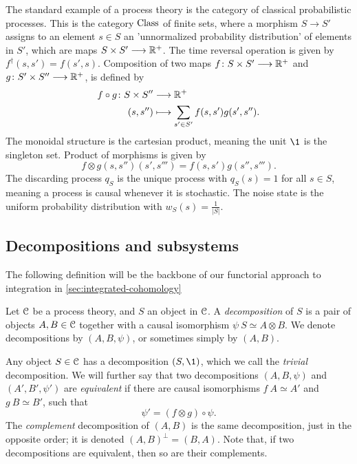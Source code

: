 \begin{example}
    The standard example of a process theory is the category of classical probabilistic processes. This is the category $\mathrm{Class}$ of finite sets, where a morphism $S\to S'$ assigns to an element $s\in S$ an 'unnormalized probability distribution' of elements in $S'$, which are maps $S\times S' \longrightarrow \mathbb{R}^+$. The time reversal operation is given by $f^\dagger(s,s') = f(s',s)$. Composition of two maps $f\colon S\times S'\longrightarrow \mathbb{R}^+$ and $g\colon S'\times S'' \longrightarrow \mathbb{R}^+$, is defined by
    \begin{align*}
        f\circ g \colon S\times S'' &\longrightarrow \mathbb{R}^+ \\
        (s,s'') &\longmapsto \sum_{s'\in S'}f(s,s')g(s',s'').
    \end{align*}
    The monoidal structure is the cartesian product, meaning the unit $\1$ is the singleton set. Product of morphisms is given by 
    $$f\otimes g (s,s'')(s',s''') = f(s,s')g(s'',s''').$$
    The discarding process $q_S$ is the unique process with $q_S(s) = 1$ for all $s\in S$, meaning a process is causal whenever it is stochastic. The noise state is the uniform probability distribution with $w_S(s) = \frac{1}{\vert S \vert}$. 
\end{example}

\subsection{Decompositions and subsystems}

The following definition will be the backbone of our functorial approach to integration in \cref{sec:integrated-cohomology}

\begin{definition}
    Let $\EuScript{C}$ be a process theory, and $S$ an object in $\EuScript{C}$. A \emph{decomposition} of $S$ is a pair of objects $A, B \in \EuScript{C}$ together with a causal isomorphism $\psi\: S \simeq A\otimes B$. We denote decompositions by $(A, B, \psi)$, or sometimes simply by $(A, B)$.
\end{definition}

Any object $S\in \EuScript{C}$ has a decomposition $(S,\1)$, which we call the \emph{trivial} decomposition. We will further say that two decompositions $(A, B, \psi)$ and $(A', B',\psi')$ are \emph{equivalent} if there are causal isomorphisms $f\: A\simeq A'$ and $g\: B\simeq B'$, such that 
$$\psi' = (f\otimes g)\circ \psi.$$
The \emph{complement} decomposition of $(A,B)$ is the same decomposition, just in the opposite order; it is denoted $(A,B)^\perp = (B, A)$. Note that, if two decompositions are equivalent, then so are their complements. 

